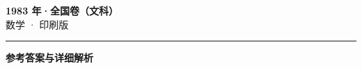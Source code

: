 \documentclass[zihao=5, a4paper]{ctexart}
\begin{document}
\begin{center}
  {\Large\bfseries 1983 年·全国卷（文科）}\\[4pt]
  {\large 数学 · 印刷版}
\end{center}
\medskip
{}

\par\bigskip\hrule\bigskip
{}
\begin{center}{\large\bfseries 参考答案与详细解析}\end{center}
\smallskip

\end{document}
